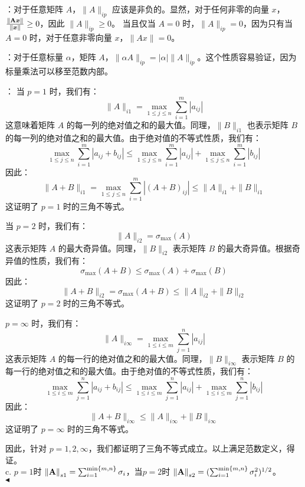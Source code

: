 \documentclass[11pt]{article}
\newenvironment{question}[2][Question]{\begin{trivlist}
\item[\hskip \labelsep {\bfseries #1}\hskip \labelsep {\bfseries #2.}]}{\hfill$\blacktriangleleft$\end{trivlist}}
\begin{document}
\begin{question}{3 (11') (矩阵范数)}
    \quad {}：对于任意矩阵 \( A \)，\(\|A\|_{ip}\) 应该是非负的。显然，对于任何非零的向量 \( x \)，\(\frac{\norm{\vb{A}\vb*{x}}}{\norm{\vb*{x}}} \geq 0\)，因此 \(\|A\|_{ip} \geq 0\)。
    当且仅当 \( A = 0 \) 时，\( \|A\|_{ip} = 0 \)，因为只有当 \( A = 0 \) 时，对于任意非零向量 \( x \)，\( \|Ax\| = 0 \)。
    
    \quad {}：对于任意标量 \( \alpha \)，矩阵 \( A \)，\(\|\alpha A\|_{ip} = |\alpha| \|A\|_{ip}\)。这个性质容易验证，因为标量乘法可以移至范数内部。
    
    \quad {}：
    当 \( p = 1 \) 时，我们有：
    \[
    \|A\|_{i1} = \max_{1 \leq j \leq n} \sum_{i=1}^{m} |a_{ij}|
    \]
    这意味着矩阵 \( A \) 的每一列的绝对值之和的最大值。同理，\( \|B\|_{i1} \) 也表示矩阵 \( B \) 的每一列的绝对值之和的最大值。由于绝对值的不等式性质，我们有：
    \[
        \max_{1 \leq j \leq n} \sum_{i=1}^{m} |a_{ij}+b_{ij}| \leq \max_{1 \leq j \leq n}{\sum_{i=1}^{m} |a_{ij}|} + \max_{1 \leq j \leq n}{\sum_{i=1}^{m} |b_{ij}|}
    \]
    因此：
    \[
    \|A + B\|_{i1} = \max_{1 \leq j \leq n} \sum_{i=1}^{m} |(A+B)_{ij}| \leq \|A\|_{i1} + \|B\|_{i1}
    \]
    这证明了 \( p = 1 \) 时的三角不等式。

    \quad \quad 当 \( p = 2 \) 时，我们有：
    \[
    \|A\|_{i2} = \sigma_{\max}(A)
    \]
    这表示矩阵 \( A \) 的最大奇异值。同理，\( \|B\|_{i2} \) 表示矩阵 \( B \) 的最大奇异值。根据奇异值的性质，我们有：
    \[
    \sigma_{\max}(A + B) \leq \sigma_{\max}(A) + \sigma_{\max}(B)
    \]
    因此：
    \[
    \|A + B\|_{i2} = \sigma_{\max}(A + B) \leq \|A\|_{i2} + \|B\|_{i2}
    \]
    这证明了 \( p = 2 \) 时的三角不等式。

    \quad {} \( p = \infty \) 时，我们有：
    \[
    \|A\|_{i\infty} = \max_{1 \leq i \leq m} \sum_{j=1}^{n} |a_{ij}|
    \]
    这表示矩阵 \( A \) 的每一行的绝对值之和的最大值。同理，\( \|B\|_{i\infty} \) 表示矩阵 \( B \) 的每一行的绝对值之和的最大值。由于绝对值的不等式性质，我们有：
    \[
    \max_{1 \leq i \leq m} \sum_{j=1}^{n} |a_{ij} + b_{ij}| \leq \max_{1 \leq i \leq m} \sum_{j=1}^{n} |a_{ij}| + \max_{1 \leq i \leq m} \sum_{j=1}^{n} |b_{ij}|
    \]
    因此：
    \[
    \|A + B\|_{i\infty} \leq \|A\|_{i\infty} + \|B\|_{i\infty}
    \]
    这证明了 \( p = \infty \) 时的三角不等式。

    因此，针对 \( p = 1, 2, \infty \)，我们都证明了三角不等式成立。以上满足范数定义，得证。\\

    c.  $p = 1$时  $\norm{\vb{A}}_{s1}= \sum_{i=1}^{\min\{m,n\}} \sigma_i$，当$p = 2$时    $\norm{\vb{A}}_{s2}= (\sum_{i=1}^{\min\{m,n\}} \sigma_i^2)^{1/2}$。\\


\end{question}
\end{document}
